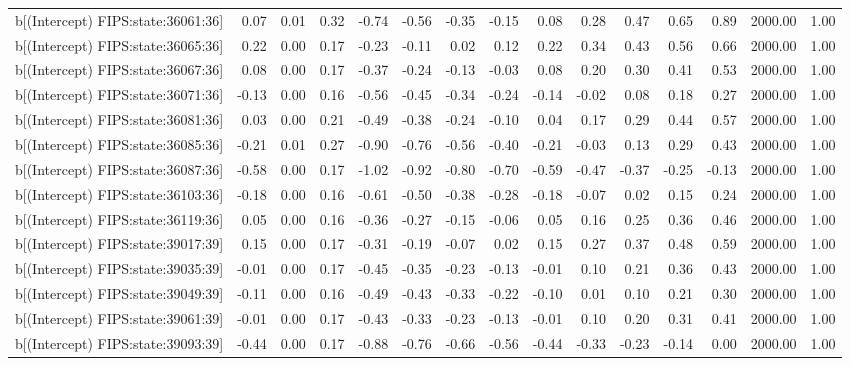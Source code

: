 \begin{table}[ht]
\begin{tabular}{rrrrrrrrrrrrrrr}
  b[(Intercept) FIPS:state:36061:36] & 0.07 & 0.01 & 0.32 & -0.74 & -0.56 & -0.35 & -0.15 & 0.08 & 0.28 & 0.47 & 0.65 & 0.89 & 2000.00 & 1.00 \\ 
  b[(Intercept) FIPS:state:36065:36] & 0.22 & 0.00 & 0.17 & -0.23 & -0.11 & 0.02 & 0.12 & 0.22 & 0.34 & 0.43 & 0.56 & 0.66 & 2000.00 & 1.00 \\ 
  b[(Intercept) FIPS:state:36067:36] & 0.08 & 0.00 & 0.17 & -0.37 & -0.24 & -0.13 & -0.03 & 0.08 & 0.20 & 0.30 & 0.41 & 0.53 & 2000.00 & 1.00 \\ 
  b[(Intercept) FIPS:state:36071:36] & -0.13 & 0.00 & 0.16 & -0.56 & -0.45 & -0.34 & -0.24 & -0.14 & -0.02 & 0.08 & 0.18 & 0.27 & 2000.00 & 1.00 \\ 
  b[(Intercept) FIPS:state:36081:36] & 0.03 & 0.00 & 0.21 & -0.49 & -0.38 & -0.24 & -0.10 & 0.04 & 0.17 & 0.29 & 0.44 & 0.57 & 2000.00 & 1.00 \\ 
  b[(Intercept) FIPS:state:36085:36] & -0.21 & 0.01 & 0.27 & -0.90 & -0.76 & -0.56 & -0.40 & -0.21 & -0.03 & 0.13 & 0.29 & 0.43 & 2000.00 & 1.00 \\ 
  b[(Intercept) FIPS:state:36087:36] & -0.58 & 0.00 & 0.17 & -1.02 & -0.92 & -0.80 & -0.70 & -0.59 & -0.47 & -0.37 & -0.25 & -0.13 & 2000.00 & 1.00 \\ 
  b[(Intercept) FIPS:state:36103:36] & -0.18 & 0.00 & 0.16 & -0.61 & -0.50 & -0.38 & -0.28 & -0.18 & -0.07 & 0.02 & 0.15 & 0.24 & 2000.00 & 1.00 \\ 
  b[(Intercept) FIPS:state:36119:36] & 0.05 & 0.00 & 0.16 & -0.36 & -0.27 & -0.15 & -0.06 & 0.05 & 0.16 & 0.25 & 0.36 & 0.46 & 2000.00 & 1.00 \\ 
  b[(Intercept) FIPS:state:39017:39] & 0.15 & 0.00 & 0.17 & -0.31 & -0.19 & -0.07 & 0.02 & 0.15 & 0.27 & 0.37 & 0.48 & 0.59 & 2000.00 & 1.00 \\ 
  b[(Intercept) FIPS:state:39035:39] & -0.01 & 0.00 & 0.17 & -0.45 & -0.35 & -0.23 & -0.13 & -0.01 & 0.10 & 0.21 & 0.36 & 0.43 & 2000.00 & 1.00 \\ 
  b[(Intercept) FIPS:state:39049:39] & -0.11 & 0.00 & 0.16 & -0.49 & -0.43 & -0.33 & -0.22 & -0.10 & 0.01 & 0.10 & 0.21 & 0.30 & 2000.00 & 1.00 \\ 
  b[(Intercept) FIPS:state:39061:39] & -0.01 & 0.00 & 0.17 & -0.43 & -0.33 & -0.23 & -0.13 & -0.01 & 0.10 & 0.20 & 0.31 & 0.41 & 2000.00 & 1.00 \\ 
  b[(Intercept) FIPS:state:39093:39] & -0.44 & 0.00 & 0.17 & -0.88 & -0.76 & -0.66 & -0.56 & -0.44 & -0.33 & -0.23 & -0.14 & 0.00 & 2000.00 & 1.00 \\ 

\end{tabular}
\end{table}
